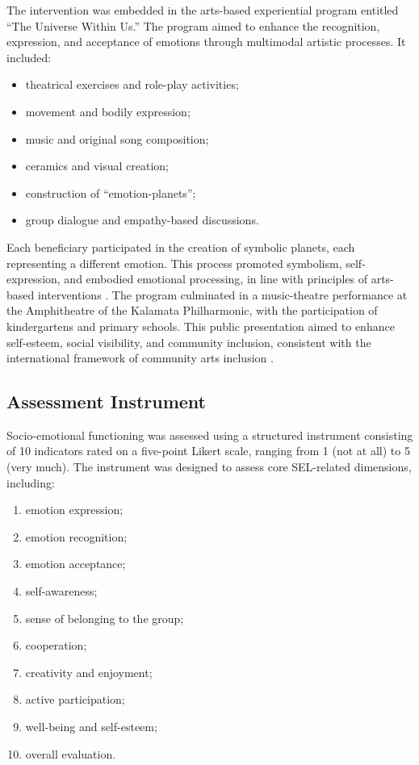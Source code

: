 \documentclass[journal]{IEEEtran}
\begin{document}
The intervention was embedded in the arts-based experiential program entitled ``The Universe Within Us.'' The program aimed to enhance the recognition, expression, and acceptance of emotions through multimodal artistic processes. It included:

\begin{itemize}
    \item theatrical exercises and role-play activities;
    \item movement and bodily expression;
    \item music and original song composition;
    \item ceramics and visual creation;
    \item construction of ``emotion-planets'';
    \item group dialogue and empathy-based discussions.
\end{itemize}

Each beneficiary participated in the creation of symbolic planets, each representing a different emotion. This process promoted symbolism, self-expression, and embodied emotional processing, in line with principles of arts-based interventions \cite{malchiodi2020,goldstein2017,hinz2009}. The program culminated in a music-theatre performance at the Amphitheatre of the Kalamata Philharmonic, with the participation of kindergartens and primary schools. This public presentation aimed to enhance self-esteem, social visibility, and community inclusion, consistent with the international framework of community arts inclusion \cite{nicholson2005,white2013}.

\subsection{Assessment Instrument}

Socio-emotional functioning was assessed using a structured instrument consisting of 10 indicators rated on a five-point Likert scale, ranging from 1 (not at all) to 5 (very much). The instrument was designed to assess core SEL-related dimensions, including:

\begin{enumerate}
    \item emotion expression;
    \item emotion recognition;
    \item emotion acceptance;
    \item self-awareness;
    \item sense of belonging to the group;
    \item cooperation;
    \item creativity and enjoyment;
    \item active participation;
    \item well-being and self-esteem;
    \item overall evaluation.
\end{enumerate}
\end{document}
